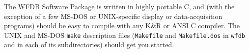 \documentclass[twoside]{article}
\begin{document}
The WFDB Software Package is written in highly portable C, and (with the
exception of a few MS-DOS or UNIX-specific display or data-acquisition
programs) should be easy to compile with any K\&R or ANSI C compiler.
The UNIX and MS-DOS {\tt make} description files ({\tt Makefile}
and {\tt Makefile.dos} in {\tt wfdb} and in each of its subdirectories)
should get you started.
\end{document}
